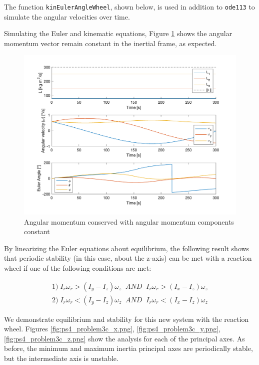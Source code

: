 The function \texttt{kinEulerAngleWheel}, shown below, is used in addition to \texttt{ode113} to simulate the angular velocities over time.



Simulating the Euler and kinematic equations, Figure \ref{fig:ps4_problem3b} shows the angular momentum vector remain constant in the inertial frame, as expected.

\begin{figure}[H]
\centering
\includegraphics[scale=0.6]{Images/ps4_problem3b.png}
\caption{Angular momentum conserved with angular momentum components constant}
\label{fig:ps4_problem3b}
\end{figure}

By linearizing the Euler equations about equilibrium, the following result shows that periodic stability (in this case, about the z-axis) can be met with a reaction wheel if one of the following conditions are met:

\begin{align*}
    1)\; I_r \omega_r > (I_y - I_z) \omega_z \;\; AND \;\; I_r \omega_r > (I_x - I_z) \omega_z \\
    2)\; I_r \omega_r < (I_y - I_z) \omega_z \;\; AND \;\; I_r \omega_r < (I_x - I_z) \omega_z
\end{align*}

We demonstrate equilibrium and stability for this new system with the reaction wheel. Figures \ref{fig:ps4_problem3c_x.png}, \ref{fig:ps4_problem3c_y.png}, \ref{fig:ps4_problem3c_z.png} show the analysis for each of the principal axes. As before, the minimum and maximum inertia principal axes are periodically stable, but the intermediate axis is unstable.

